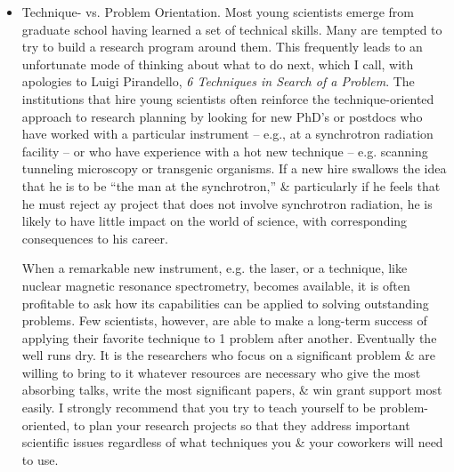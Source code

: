 \documentclass{article}
\begin{document}
\begin{enumerate}
\begin{itemize}
\begin{itemize}
			Because beating your head against a wall is neither satisfying nor productive, you should be wary of embarking on long-term efforts, whether formulated by yourself or suggested by a mentor or collaborator. It may make better sense to put off work on that important problem until new techniques have been developed -- perhaps by you, perhaps by somebody else -- than pushing ahead, on the assumption that brute force will eventually lead to success.

			Apart from whether you will be able to obtain significant results before your return to the job market or your consideration by a tenure committee, a serious peril of the brute-force approach is that a competitor will develop a labor-saving new technique \& race to the goal while you are still struggling.
			\item {\sf Technique- vs. Problem Orientation.} Most young scientists emerge from graduate school having learned a set of technical skills. Many are tempted to try to build a research program around them. This frequently leads to an unfortunate mode of thinking about what to do next, which I call, with apologies to {\sc Luigi Pirandello}, {\it6 Techniques in Search of a Problem}. The institutions that hire young scientists often reinforce the technique-oriented approach to research planning by looking for new PhD's or postdocs who have worked with a particular instrument -- e.g., at a synchrotron radiation facility -- or who have experience with a hot new technique -- e.g. scanning tunneling microscopy or transgenic organisms. If a new hire swallows the idea that he is to be ``the man at the synchrotron,'' \& particularly if he feels that he must reject ay project that does not involve synchrotron radiation, he is likely to have little impact on the world of science, with corresponding consequences to his career.

			When a remarkable new instrument, e.g. the laser, or a technique, like nuclear magnetic resonance spectrometry, becomes available, it is often profitable to ask how its capabilities can be applied to solving outstanding problems. Few scientists, however, are able to make a long-term success of applying their favorite technique to 1 problem after another. Eventually the well runs dry. It is the researchers who focus on a significant problem \& are willing to bring to it whatever resources are necessary who give the most absorbing talks, write the most significant papers, \& win grant support most easily. I strongly recommend that you try to teach yourself to be problem-oriented, to plan your research projects so that they address important scientific issues regardless of what techniques you \& your coworkers will need to use.


\end{itemize}
\end{itemize}
\end{enumerate}
\end{document}
